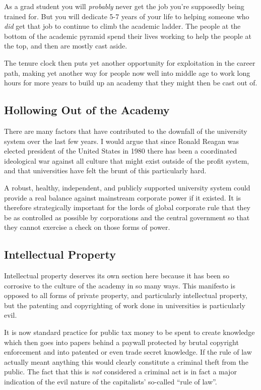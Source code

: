 As a grad student you will \emph{probably} never get the job you're
supposedly being trained for. But you will dedicate 5-7 years of your
life to helping someone who \emph{did} get that job to continue to climb
the academic ladder. The people at the bottom of the academic pyramid
spend their lives working to help the people at the top, and then are
mostly cast aside.

The tenure clock then puts yet another opportunity for exploitation in
the career path, making yet another way for people now well into middle
age to work long hours for more years to build up an academy that they
might then be cast out of.

\subsection{Hollowing Out of the
Academy}\label{hollowing-out-of-the-academy}

There are many factors that have contributed to the downfall of the
university system over the last few years. I would argue that since
Ronald Reagan was elected president of the United States in 1980 there
has been a coordinated ideological war against all culture that might
exist outside of the profit system, and that universities have felt the
brunt of this particularly hard.

A robust, healthy, independent, and publicly supported university system
could provide a real balance against mainstream corporate power if it
existed. It is therefore strategically important for the lords of global
corporate rule that they be as controlled as possible by corporations
and the central government so that they cannot exercise a check on those
forms of power.

\subsection{Intellectual Property}\label{intellectual-property}

Intellectual property deserves its own section here because it has been
so corrosive to the culture of the academy in so many ways. This
manifesto is opposed to all forms of private property, and particularly
intellectual property, but the patenting and copyrighting of work done
in universities is particularly evil.

It is now standard practice for public tax money to be spent to create
knowledge which then goes into papers behind a paywall protected by
brutal copyright enforcement and into patented or even trade secret
knowledge. If the rule of law actually meant anything this would clearly
constitute a criminal theft from the public. The fact that this is
\emph{not} considered a criminal act is in fact a major indication of
the evil nature of the capitalists' so-called ``rule of law''.

